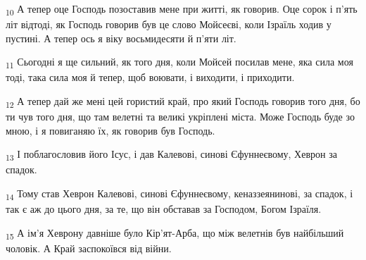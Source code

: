 \begin{tcolorbox}
\textsubscript{10} А тепер оце Господь позоставив мене при житті, як говорив. Оце сорок і п'ять літ відтоді, як Господь говорив був це слово Мойсеєві, коли Ізраїль ходив у пустині. А тепер ось я віку восьмидесяти й п'яти літ.
\end{tcolorbox}
\begin{tcolorbox}
\textsubscript{11} Сьогодні я ще сильний, як того дня, коли Мойсей посилав мене, яка сила моя тоді, така сила моя й тепер, щоб воювати, і виходити, і приходити.
\end{tcolorbox}
\begin{tcolorbox}
\textsubscript{12} А тепер дай же мені цей гористий край, про який Господь говорив того дня, бо ти чув того дня, що там велетні та великі укріплені міста. Може Господь буде зо мною, і я повиганяю їх, як говорив був Господь.
\end{tcolorbox}
\begin{tcolorbox}
\textsubscript{13} І поблагословив його Ісус, і дав Калевові, синові Єфуннеєвому, Хеврон за спадок.
\end{tcolorbox}
\begin{tcolorbox}
\textsubscript{14} Тому став Хеврон Калевові, синові Єфуннеєвому, кеназзеянинові, за спадок, і так є аж до цього дня, за те, що він обставав за Господом, Богом Ізраїля.
\end{tcolorbox}
\begin{tcolorbox}
\textsubscript{15} А ім'я Хеврону давніше було Кір'ят-Арба, що між велетнів був найбільший чоловік. А Край заспокоївся від війни.
\end{tcolorbox}
